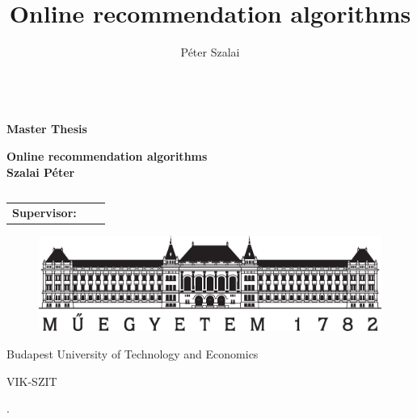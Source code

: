 \documentclass[a4paper,11pt,oneside,usenames,dvipsnames]{report}
\title{Online recommendation algorithms}
\author{P\'eter Szalai}
\begin{document}

\thispagestyle{empty}
\begin{center}

{ $\left. \right.$ \\ \vspace{0.5cm} \large \textbf{Master Thesis} \\ }
\vspace{2cm}

{ \large \textbf{Online recommendation algorithms} \\
\vspace{1cm}  
\textbf{Szalai P\'eter} \\ }
\vspace{2cm}

\begin{tabular}{c}

\end{tabular}

\begin{tabular}{l l l }
 {\bf Supervisor:}
\end{tabular}

\vspace*{2cm}


\begin{figure}[h]
\centering
\includegraphics[scale=.4]{tex/pic/bme_logo.eps}
\end{figure}
\vspace*{-.25cm}
\begin{center}
{\normalsize \rmfamily Budapest University of Technology and Economics}
\end{center}
\vspace*{-.5cm}
\begin{center}
{\normalsize \rmfamily VIK-SZIT}
\end{center}

\begin{center}
{\normalsize {}.}
\end{center} 

\end{center}
\newpage

\tableofcontents
{}

\setcounter{page}{1}






\newpage
\begin{thebibliography}{9}

\end{thebibliography}
\end{document}
